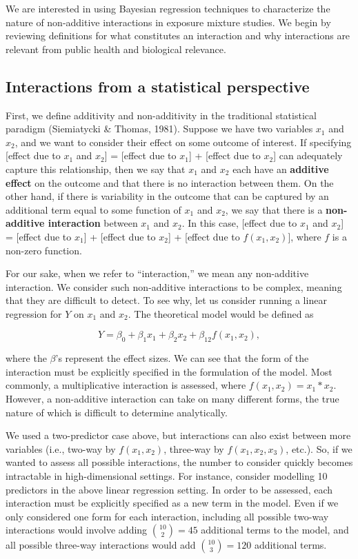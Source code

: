 \documentclass[12pt, twoside]{amherstthesis}
\begin{document}
We are interested in using Bayesian regression techniques to characterize the nature of non-additive interactions in exposure mixture studies. We begin by reviewing definitions for what constitutes an interaction and why interactions are relevant from public health and biological relevance.

\hypertarget{interactions-from-a-statistical-perspective}{%
\subsection{Interactions from a statistical perspective}\label{interactions-from-a-statistical-perspective}}

First, we define additivity and non-additivity in the traditional statistical paradigm (Siemiatycki \& Thomas, 1981). Suppose we have two variables \(x_1\) and \(x_2\), and we want to consider their effect on some outcome of interest. If specifying {[}effect due to \(x_1\) and \(x_2\){]} = {[}effect due to \(x_1\){]} + {[}effect due to \(x_2\){]} can adequately capture this relationship, then we say that \(x_1\) and \(x_2\) each have an \textbf{additive effect} on the outcome and that there is no interaction between them. On the other hand, if there is variability in the outcome that can be captured by an additional term equal to some function of \(x_1\) and \(x_2\), we say that there is a \textbf{non-additive interaction} between \(x_1\) and \(x_2\). In this case, {[}effect due to \(x_1\) and \(x_2\){]} = {[}effect due to \(x_1\){]} + {[}effect due to \(x_2\){]} + {[}effect due to \(f(x_1, x_2)\){]}, where \(f\) is a non-zero function.

For our sake, when we refer to ``interaction,'' we mean any non-additive interaction. We consider such non-additive interactions to be complex, meaning that they are difficult to detect. To see why, let us consider running a linear regression for \(Y\) on \(x_1\) and \(x_2\). The theoretical model would be defined as

\[
Y = \beta_0+\beta_1x_1+\beta_2x_2 + \beta_{12}f(x_1, x_2),
\]

\noindent where the \(\beta\)'s represent the effect sizes. We can see that the form of the interaction must be explicitly specified in the formulation of the model. Most commonly, a multiplicative interaction is assessed, where \(f(x_1, x_2) = x_1*x_2\). However, a non-additive interaction can take on many different forms, the true nature of which is difficult to determine analytically.

We used a two-predictor case above, but interactions can also exist between more variables (i.e., two-way by \(f(x_1, x_2)\), three-way by \(f(x_1, x_2, x_3)\), etc.). So, if we wanted to assess all possible interactions, the number to consider quickly becomes intractable in high-dimensional settings. For instance, consider modelling 10 predictors in the above linear regression setting. In order to be assessed, each interaction must be explicitly specified as a new term in the model. Even if we only considered one form for each interaction, including all possible two-way interactions would involve adding \({10 \choose 2} = 45\) additional terms to the model, and all possible three-way interactions would add \({10 \choose 3} = 120\) additional terms.
\end{document}
